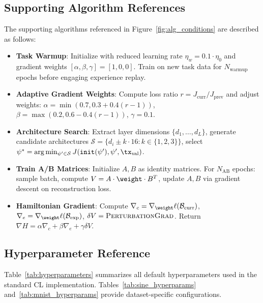 \subsection{Supporting Algorithm References}
\label{sec:supporting_algs}

The supporting algorithms referenced in Figure~\ref{fig:alg_conditions} are described as follows:

\begin{itemize}
\item \textbf{Task Warmup}\label{alg:warmup}: Initialize with reduced learning rate $\eta_w = 0.1 \cdot \eta_0$ and gradient weights $[\alpha,\beta,\gamma] = [1, 0, 0]$. Train on new task data for $N_{\text{warmup}}$ epochs before engaging experience replay.

\item \textbf{Adaptive Gradient Weights}\label{alg:adaptive}: Compute loss ratio $r = J_{\text{curr}} / J_{\text{prev}}$ and adjust weights: $\alpha = \min(0.7, 0.3 + 0.4(r-1))$, $\beta = \max(0.2, 0.6 - 0.4(r-1))$, $\gamma = 0.1$.

\item \textbf{Architecture Search}\label{alg:arch_search}: Extract layer dimensions $\{d_1, \ldots, d_L\}$, generate candidate architectures $\mathcal{S} = \{d_i \pm k \cdot 16 : k \in \{1,2,3\}\}$, select $\psi^* = \arg\min_{\psi' \in \mathcal{S}} J(\texttt{init}(\psi'), \psi', \tx_{\text{val}})$.

\item \textbf{Train A/B Matrices}\label{alg:train_ab}: Initialize $A, B$ as identity matrices. For $N_{\text{AB}}$ epochs: sample batch, compute $V = A \cdot \weight \cdot B^T$, update $A, B$ via gradient descent on reconstruction loss.

\item \textbf{Hamiltonian Gradient}\label{alg:hamiltonian}: Compute $\nabla_c = \nabla_{\weight} \ell(\mathcal{B}_{\text{curr}})$, $\nabla_e = \nabla_{\weight} \ell(\mathcal{B}_{\text{exp}})$, $\delta V = \textsc{PerturbationGrad}$. Return $\nabla H = \alpha \nabla_c + \beta \nabla_e + \gamma \delta V$.
\end{itemize}

\subsection{Hyperparameter Reference}

Table~\ref{tab:hyperparameters} summarizes all default hyperparameters used in the standard CL implementation. Tables~\ref{tab:sine_hyperparams} and~\ref{tab:mnist_hyperparams} provide dataset-specific configurations.

